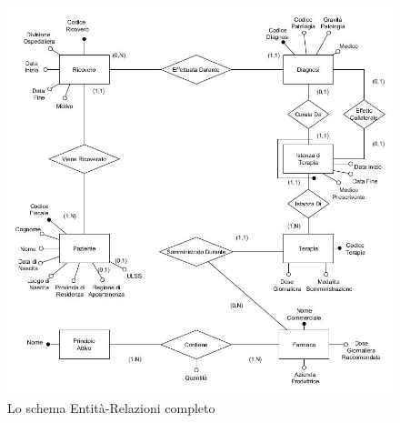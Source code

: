 \documentclass{article}
\begin{document}
\begin{figure}[!ht] %
  \centering
  \includegraphics[width=\linewidth]{schema2.jpg}
  \caption{Lo schema Entità-Relazioni completo}
  \label{schema_ER_ristrutturato}
\end{figure}
\end{document}
